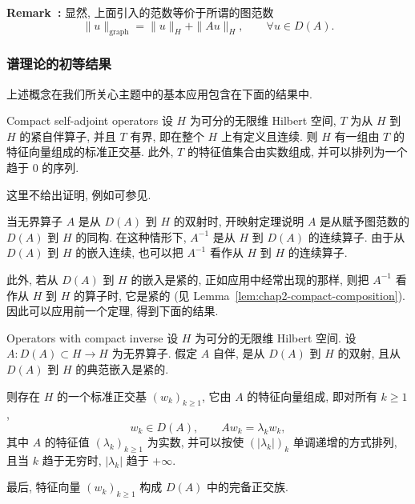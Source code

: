 \par\noindent{}\textbf{Remark~\thechaptersixremark:}\label{rem:chap2-graph-norm-equivalence}\quad
显然, 上面引入的范数等价于所谓的图范数
\[
 \|u\|_{\mathrm{graph}}=\|u\|_H+\|Au\|_H,
 \qquad\forall u\in D(A).
\]

\subsubsection{谱理论的初等结果}
\label{subsec:chap2-elementary-spectral-theory}

上述概念在我们所关心主题中的基本应用包含在下面的结果中.

\begin{Theorem}{Compact self-adjoint operators}
\label{thm:chap2-compact-self-adjoint-spectral}
设 $H$ 为可分的无限维 Hilbert 空间, $T$ 为从 $H$ 到 $H$ 的紧自伴算子, 并且 $T$ 有界, 即在整个 $H$ 上有定义且连续. 则 $H$ 有一组由 $T$ 的特征向量组成的标准正交基. 此外, $T$ 的特征值集合由实数组成, 并可以排列为一个趋于 $0$ 的序列.
\end{Theorem}

这里不给出证明, 例如可参见.

当无界算子 $A$ 是从 $D(A)$ 到 $H$ 的双射时, 开映射定理说明 $A$ 是从赋予图范数的 $D(A)$ 到 $H$ 的同构. 在这种情形下, $A^{-1}$ 是从 $H$ 到 $D(A)$ 的连续算子. 由于从 $D(A)$ 到 $H$ 的嵌入连续, 也可以把 $A^{-1}$ 看作从 $H$ 到 $H$ 的连续算子.

此外, 若从 $D(A)$ 到 $H$ 的嵌入是紧的, 正如应用中经常出现的那样, 则把 $A^{-1}$ 看作从 $H$ 到 $H$ 的算子时, 它是紧的 (见 Lemma~\ref{lem:chap2-compact-composition}). 因此可以应用前一个定理, 得到下面的结果.

\begin{Theorem}{Operators with compact inverse}
\label{thm:chap2-compact-inverse-spectral}
设 $H$ 为可分的无限维 Hilbert 空间. 设 $A:D(A)\subset H\to H$ 为无界算子. 假定 $A$ 自伴, 是从 $D(A)$ 到 $H$ 的双射, 且从 $D(A)$ 到 $H$ 的典范嵌入是紧的.

则存在 $H$ 的一个标准正交基 $(w_k)_{k\geq1}$, 它由 $A$ 的特征向量组成, 即对所有 $k\geq1$,
\[
 w_k\in D(A),\qquad Aw_k=\lambda_k w_k,
\]
其中 $A$ 的特征值 $(\lambda_k)_{k\geq1}$ 为实数, 并可以按使 $(|\lambda_k|)_k$ 单调递增的方式排列, 且当 $k$ 趋于无穷时, $|\lambda_k|$ 趋于 $+\infty$.

最后, 特征向量 $(w_k)_{k\geq1}$ 构成 $D(A)$ 中的完备正交族.
\end{Theorem}

